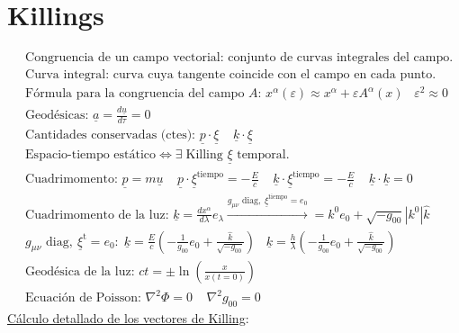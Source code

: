\section*{Killings}
\begin{align*}
    &\text{Congruencia  de un campo vectorial: conjunto de curvas integrales del campo.}\\
    &\text{Curva integral: curva cuya tangente coincide con el campo en cada punto.}\\
    &\text{Fórmula para la congruencia del campo $A$: }x^\alpha (\varepsilon)\approx x^\alpha + \varepsilon A^\alpha (x)\; \; \; \varepsilon^2 \approx 0\\
    &\text{Geodésicas: } \underline{a}=\tfrac{d\underline{u}}{d\tau}=0\\
    &\text{Cantidades conservadas (ctes): } \underline{p}\cdot \underline{\xi}\;\; \; \; \underline{k}\cdot \underline{\xi} \\
    &\text{Espacio-tiempo estático} \Leftrightarrow \exists \;\text{Killing } \underline{\xi} \text{ temporal.}\\
    &\text{Cuadrimomento: } \underline{p}=m\underline{u}\; \; \; \; \underline{p}\cdot\underline{\xi}^{\text{tiempo}} = -\frac{E}{c}\; \; \; \; \underline{k}\cdot\underline{\xi}^{\text{tiempo}} = -\frac{E}{c}\; \; \;\;  \underline{k}\cdot\underline{k}=0\;\\
    &\text{Cuadrimomento de la luz: }\underline{k} \!=\!\frac{dx^\alpha}{d\lambda}e_\lambda \!\xrightarrow{g_{\mu \nu} \text{ diag}, \; \underline{\xi}^{\text{tiempo}}=e_0}=\! k^0e_0 \!+\! \sqrt{-g_{00}}|k^0|\hat{k}\\
    &g_{\mu \nu} \text{ diag}, \: \underline{\xi}^{\text{t}}=e_0:\; \underline{k}=\frac{E}{c}\left(-\frac{1}{g_{00}}e_0+\frac{\hat{k}}{\sqrt{-g_{00}}}\right)\; \; \;  \underline{k}=\frac{h}{\lambda}\left(-\frac{1}{g_{00}}e_0+\frac{\hat{k}}{\sqrt{-g_{00}}}\right)\\
    &\text{Geodésica de la luz: } ct= \pm \ln\left(\frac{x}{x(t=0)}\right) \\
    &\text{Ecuación de Poisson: }\nabla^2 \Phi = 0 \; \; \; \; \nabla^2g_{00}=0
\end{align*}
\underline{Cálculo detallado de los vectores de Killing}:
